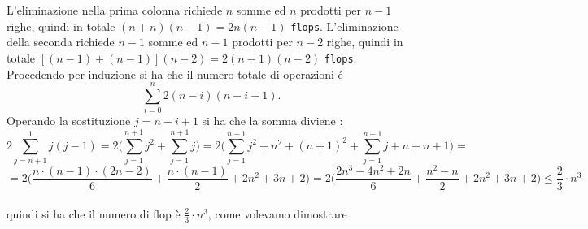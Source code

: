 \begin{flushleft}
L'eliminazione nella prima colonna richiede $n$ somme ed $n$ prodotti per $n-1$ righe, quindi in totale $(n+n)(n-1) = 2n(n-1)$ \texttt{flops}. L'eliminazione della seconda richiede $n-1$ somme ed $n-1$ prodotti per $n-2$ righe, quindi in totale $[(n-1)+(n-1)](n-2) = 2(n-1)(n-2)$ \texttt{flops}.\\
Procedendo per induzione si ha che il numero totale di operazioni \'e
\[
\sum_{i=0}^{n} 2(n-i)(n-i+1).
\]
Operando la sostituzione $j = n-i+1$ si ha che la somma diviene :
\[
2 \sum_{j=n+1}^{1} j(j-1) = 2\Big( \sum_{j=1}^{n+1}j^2 + \sum_{j=1}^{n+1}j\Big) = 2\Big(\sum_{j=1}^{n-1}j^2 + n^2 + (n+1)^2 + \sum_{j=1}^{n-1}j +n +n+1 \Big) =
\]
\[
= 2\Big( \frac{n\cdot (n-1)\cdot(2n-2)}{6} + \frac{n\cdot(n-1)}{2} + 2n^2 +3n +2 \Big) = 2\Big(\frac{2n^3-4n^2+2n}{6} +\frac{n^2-n}{2} + 2n^2 +3n +2\Big) \leq \frac{2}{3}\cdot n^3
\]
\\

quindi si ha che il numero di flop è $\frac{2}{3}\cdot n^3$, come volevamo dimostrare
\end{flushleft}